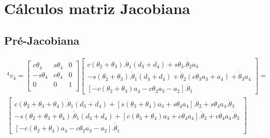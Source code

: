 
\chapter{Cálculos matriz Jacobiana}
\label{AnexoJacobiana}

\section{Pré-Jacobiana}
\label{AnexoJacobiana-SecPre}

\begin{equation}
\begin{split}
    ^4v_4 = \begin{bmatrix}
        c\theta_4 & s\theta_4 & 0 \\
        -s\theta_4 & c\theta_4 & 0 \\
        0 & 0 & 1 \\
    \end{bmatrix}
    \begin{bmatrix}
        c(\theta_2 + \theta_3).\dot{\theta}_1(d_3 + d_4) + s\theta_3.\dot{\theta}_2a_3 \\ 
        -s(\theta_2 + \theta_3).\dot{\theta}_1(d_3 + d_4) + \dot{\theta}_2(c\theta_3a_3 + a_4) + \dot{\theta}_3a_4\\ 
        [-c(\theta_2 + \theta_3)a_4 - c\theta_2a_3 - a_2].\dot{\theta}_1
    \end{bmatrix} = \\
    \begin{bmatrix}
        c(\theta_2 + \theta_3 + \theta_4).\dot{\theta}_1(d_3+d_4) + [s(\theta_3+\theta_4)a_3 + s\theta_4a_4].\dot{\theta}_2 + s\theta_4a_4.\dot{\theta}_3 \\ 
        -s(\theta_2 + \theta_3 + \theta_4).\dot{\theta}_1(d_3+d_4) + [c(\theta_3+\theta_4)a_3 + c\theta_4a_4].\dot{\theta}_2 + c\theta_4a_4.\dot{\theta}_3 \\ 
        [-c(\theta_2 + \theta_3)a_4 - c\theta_2a_3 - a_2].\dot{\theta}_1
    \end{bmatrix}
\end{split}
\end{equation}

